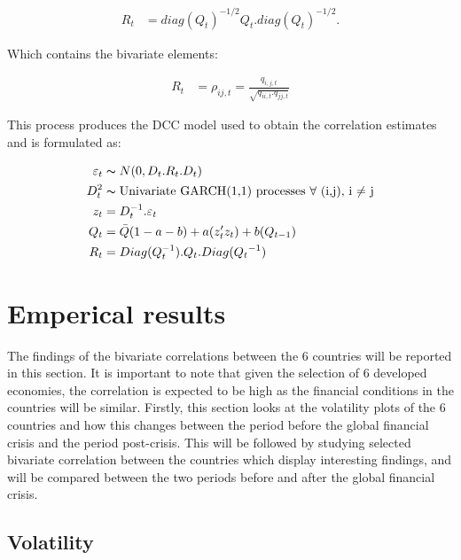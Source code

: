 \documentclass[11pt,preprint, authoryear]{elsarticle}
\numberwithin{equation}{section}
\numberwithin{figure}{section}
\numberwithin{table}{section}
\begin{document}
\begin{align}\label{eq:dcc3}
R_t &= diag(Q_t)^{-1/2}Q_t.diag(Q_t)^{-1/2}. 
\end{align}

Which contains the bivariate elements:

\begin{align}
R_t &= \rho_{ij,t} = \frac{q_{i,j,t}}{\sqrt{q_{ii,t}.q_{jj,t}}} 
\end{align}

This process produces the DCC model used to obtain the correlation
estimates and is formulated as:

\begin{align}
\varepsilon_t &\thicksim  N(0,D_t.R_t.D_t) \notag \\
D_t^2 &\thicksim \text{Univariate GARCH(1,1) processes $\forall$ (i,j), i $\ne$ j} \notag \\
z_t&=D_t^{-1}.\varepsilon_t \notag \\
Q_t &= \bar{Q}(1-a-b)+a(z_t'z_t)+b(Q_{t-1}) \notag \\
                        R_t &= Diag(Q_t^{-1}).Q_t.Diag({Q_t}^{-1}) \notag \\
                        \end{align}

\section{Emperical results}\label{emperical-results}

The findings of the bivariate correlations between the 6 countries will
be reported in this section. It is important to note that given the
selection of 6 developed economies, the correlation is expected to be
high as the financial conditions in the countries will be similar.
Firstly, this section looks at the volatility plots of the 6 countries
and how this changes between the period before the global financial
crisis and the period post-crisis. This will be followed by studying
selected bivariate correlation between the countries which display
interesting findings, and will be compared between the two periods
before and after the global financial crisis.

\subsection{\texorpdfstring{Volatility
\label{volatility}}{Volatility }}\label{volatility}
\end{document}

